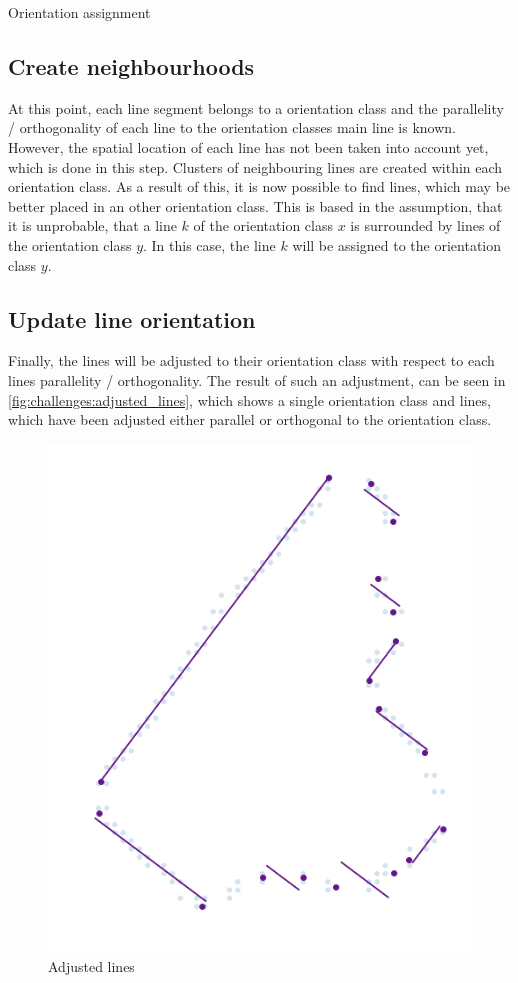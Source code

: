 \begin{algorithm}[H]
\caption{Orientation assignment}
\label{alg:challenges:define_orientations}
\end{algorithm}

\subsection{Create neighbourhoods}
At this point, each line segment belongs to a orientation class and the parallelity / orthogonality of each line to the orientation classes main line is known. However, the spatial location of each line has not been taken into account yet, which is done in this step. Clusters of neighbouring lines are created within each orientation class. As a result of this, it is now possible to find lines, which may be better placed in an other orientation class. This is based in the assumption, that it is unprobable, that a line $k$ of the orientation class $x$ is surrounded by lines of the orientation class $y$. In this case, the line $k$ will be assigned to the orientation class $y$.

\subsection{Update line orientation}
Finally, the lines will be adjusted to their orientation class with respect to each lines parallelity / orthogonality. The result of such an adjustment, can be seen in \autoref{fig:challenges:adjusted_lines}, which shows a single orientation class and lines, which have been adjusted either parallel or orthogonal to the orientation class.

\begin{figure}[H]
    \centering
	\includegraphics[width=0.4\linewidth]{chapters/challenges/images/adjusted_lines.png}
	\caption{Adjusted lines}
	\label{fig:challenges:adjusted_lines}
\end{figure}

